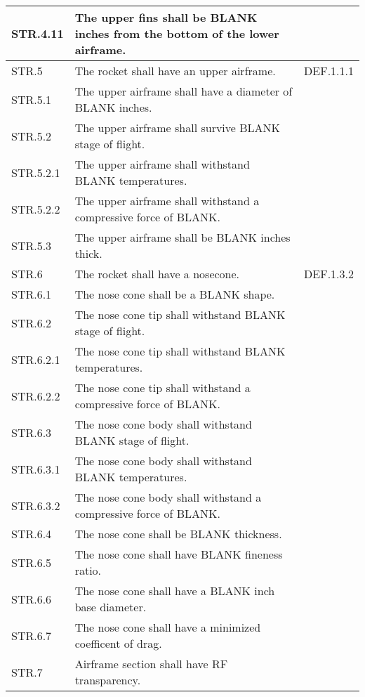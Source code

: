 \begin{table}[htbp]
\begin{tabulary}{\textwidth}{@{}LLL@{}}
        STR.4.11 & The upper fins shall be BLANK inches from the bottom of the lower airframe. &  \\
    \midrule
        STR.5 & The rocket shall have an upper airframe. & DEF.1.1.1 \\
        STR.5.1 & The upper airframe shall have a diameter of BLANK inches. &  \\
        STR.5.2 & The upper airframe shall survive BLANK stage of flight. &  \\
        STR.5.2.1 & The upper airframe shall withstand BLANK temperatures. &  \\
        STR.5.2.2 & The upper airframe shall withstand a compressive force of BLANK. &  \\
        STR.5.3 & The upper airframe shall be BLANK inches thick. &  \\
    \midrule
        STR.6 & The rocket shall have a nosecone. & DEF.1.3.2 \\
        STR.6.1 & The nose cone shall be a BLANK shape. &  \\
        STR.6.2 & The nose cone tip shall withstand BLANK stage of flight. &  \\
        STR.6.2.1 & The nose cone tip shall withstand BLANK temperatures. &  \\
        STR.6.2.2 & The nose cone tip shall withstand a compressive force of BLANK. &  \\
        STR.6.3 & The nose cone body shall withstand BLANK stage of flight. &  \\
        STR.6.3.1 & The nose cone body shall withstand BLANK temperatures. &  \\
        STR.6.3.2 & The nose cone body shall withstand a compressive force of BLANK. &  \\
        STR.6.4 & The nose cone shall be BLANK thickness. &  \\
        STR.6.5 & The nose cone shall have BLANK fineness ratio. &  \\
        STR.6.6 & The nose cone shall have a BLANK inch base diameter. &  \\
        STR.6.7 & The nose cone shall have a minimized coefficent of drag. &  \\
    \midrule
        STR.7 & Airframe section shall have RF transparency. &  \\
    \bottomrule
    \end{tabulary}

    \label{table:all-str-req}
\end{table}

\pagebreak